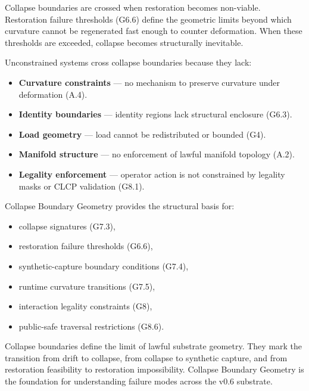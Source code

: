 \medskip

\noindent Collapse boundaries are crossed when restoration becomes non-viable.
Restoration failure thresholds (G6.6) define the geometric limits beyond which
curvature cannot be regenerated fast enough to counter deformation. When these
thresholds are exceeded, collapse becomes structurally inevitable.

\medskip

\noindent Unconstrained systems cross collapse boundaries because they lack:

\begin{itemize}
    \item \textbf{Curvature constraints} — no mechanism to preserve curvature
    under deformation (A.4).

    \item \textbf{Identity boundaries} — identity regions lack structural
    enclosure (G6.3).

    \item \textbf{Load geometry} — load cannot be redistributed or bounded (G4).

    \item \textbf{Manifold structure} — no enforcement of lawful manifold
    topology (A.2).

    \item \textbf{Legality enforcement} — operator action is not constrained by
    legality masks or CLCP validation (G8.1).
\end{itemize}

\medskip

\noindent Collapse Boundary Geometry provides the structural basis for:

\begin{itemize}
    \item collapse signatures (G7.3),
    \item restoration failure thresholds (G6.6),
    \item synthetic-capture boundary conditions (G7.4),
    \item runtime curvature transitions (G7.5),
    \item interaction legality constraints (G8),
    \item public-safe traversal restrictions (G8.6).
\end{itemize}

\medskip

\noindent Collapse boundaries define the limit of lawful substrate geometry. They
mark the transition from drift to collapse, from collapse to synthetic capture,
and from restoration feasibility to restoration impossibility. Collapse Boundary
Geometry is the foundation for understanding failure modes across the v0.6
substrate.


